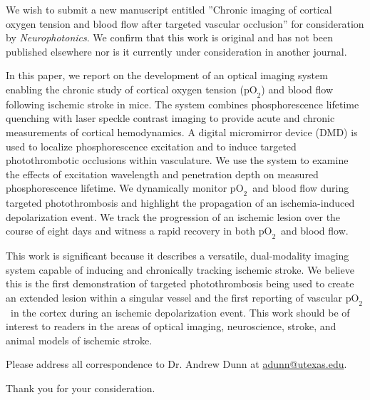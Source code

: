 \documentclass[12pt,stdletter,orderfromtodate,dateleft,sigleft]{newlfm}
\newcommand{\pO}{\ensuremath{\text{pO}_2}}
\begin{document}
\begin{newlfm}

We wish to submit a new manuscript entitled ''Chronic imaging of cortical oxygen tension and blood flow after targeted vascular occlusion'' for consideration by \emph{Neurophotonics}. We confirm that this work is original and has not been published elsewhere nor is it currently under consideration in another journal.

In this paper, we report on the development of an optical imaging system enabling the chronic study of cortical oxygen tension (\pO) and blood flow following ischemic stroke in mice. The system combines phosphorescence lifetime quenching with laser speckle contrast imaging to provide acute and chronic measurements of cortical hemodynamics. A digital micromirror device (DMD) is used to localize phosphorescence excitation and to induce targeted photothrombotic occlusions within vasculature. We use the system to examine the effects of excitation wavelength and penetration depth on measured phosphorescence lifetime. We dynamically monitor \pO\ and blood flow during targeted photothrombosis and highlight the propagation of an ischemia-induced depolarization event. We track the progression of an ischemic lesion over the course of eight days and witness a rapid recovery in both \pO\ and blood flow.

This work is significant because it describes a versatile, dual-modality imaging system capable of inducing and chronically tracking ischemic stroke. We believe this is the first demonstration of targeted photothrombosis being used to create an extended lesion within a singular vessel and the first reporting of vascular \pO\ in the cortex during an ischemic depolarization event. This work should be of interest to readers in the areas of optical imaging, neuroscience, stroke, and animal models of ischemic stroke.

Please address all correspondence to Dr. Andrew Dunn at \underline{adunn@utexas.edu}.

Thank you for your consideration.

\end{newlfm}
\end{document}
